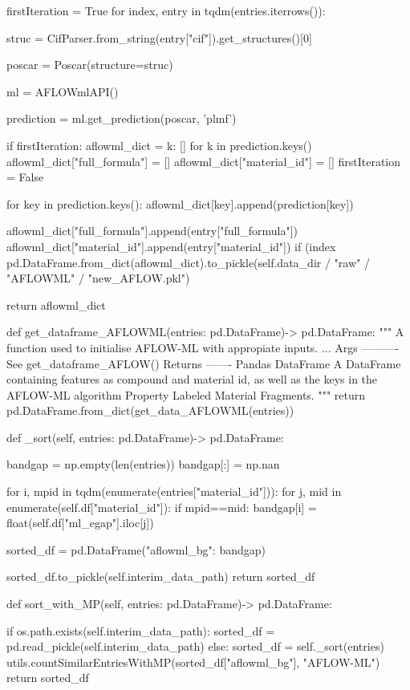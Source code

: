         firstIteration = True
        for index, entry in tqdm(entries.iterrows()):

            struc = CifParser.from_string(entry["cif"]).get_structures()[0]

            poscar = Poscar(structure=struc)

            ml = AFLOWmlAPI()

            prediction = ml.get_prediction(poscar, 'plmf')

            if firstIteration:
                aflowml_dict = {k: [] for k in prediction.keys()}
                aflowml_dict["full_formula"] = []
                aflowml_dict["material_id"]  = []
                firstIteration = False

            for key in prediction.keys():
                aflowml_dict[key].append(prediction[key])

            aflowml_dict["full_formula"].append(entry["full_formula"])
            aflowml_dict["material_id"].append(entry["material_id"])
            if (index %
                pd.DataFrame.from_dict(aflowml_dict).to_pickle(self.data_dir / "raw"  / "AFLOWML" / "new_AFLOW.pkl")

        return aflowml_dict

    def get_dataframe_AFLOWML(entries: pd.DataFrame)-> pd.DataFrame:
        """
        A function used to initialise AFLOW-ML with appropiate inputs.
        ...
        Args
        ----------
        See get_dataframe_AFLOW()
        Returns
        -------
        Pandas DataFrame
            A DataFrame containing features as compound and material id,
            as well as the keys in the AFLOW-ML algorithm Property
            Labeled Material Fragments.
        """
        return pd.DataFrame.from_dict(get_data_AFLOWML(entries))

    def _sort(self, entries: pd.DataFrame)-> pd.DataFrame:

        bandgap = np.empty(len(entries))
        bandgap[:] = np.nan

        for i, mpid in tqdm(enumerate(entries["material_id"])):
            for j, mid in enumerate(self.df["material_id"]):
                if mpid==mid:
                    bandgap[i] = float(self.df["ml_egap"].iloc[j])

        sorted_df = pd.DataFrame({"aflowml_bg": bandgap})

        sorted_df.to_pickle(self.interim_data_path)
        return sorted_df

    def sort_with_MP(self, entries: pd.DataFrame)-> pd.DataFrame:

        if os.path.exists(self.interim_data_path):
            sorted_df = pd.read_pickle(self.interim_data_path)
        else:
            sorted_df = self._sort(entries)
        utils.countSimilarEntriesWithMP(sorted_df["aflowml_bg"], "AFLOW-ML")
        return sorted_df
